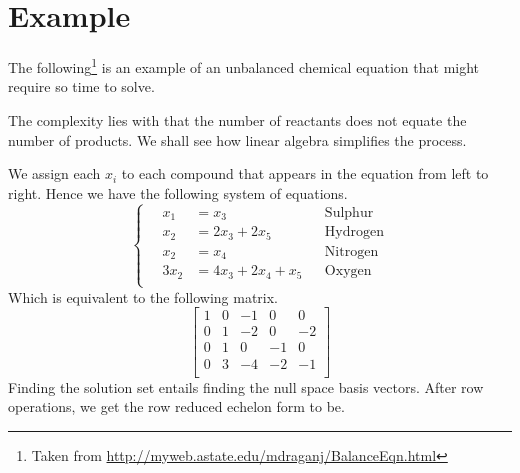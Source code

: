 \documentclass{article}
\begin{document}
\section{Example}
The following\footnote{Taken from \url{http://myweb.astate.edu/mdraganj/BalanceEqn.html}} is an example of an unbalanced chemical equation that might require so time to solve.
\begin{center}
\end{center}
The complexity lies with that the number of reactants does not equate the number of products. We shall see how linear algebra simplifies the process.

We assign each $x_i$ to each compound that appears in the equation from left to right. Hence we have the following system of equations.
\begin{equation*}
\left\{
\quad
	\begin{aligned}
	x_1  &= x_3 &&\text{Sulphur}\\
	x_2  &= 2x_3 + 2x_5 &&\text{Hydrogen}\\
	x_2  &= x_4 &&\text{Nitrogen}\\
	3x_2 &= 4x_3 + 2x_4 + x_5 &&\text{Oxygen} \\
	\end{aligned}
\right.
\end{equation*}
Which is equivalent to the following matrix.
\begin{equation*}
\begin{bmatrix} 
1 &  0 & -1 &  0 &  0 \\
0 &  1 & -2 &  0 & -2 \\
0 &  1 &  0 & -1 &  0 \\
0 &  3 & -4 & -2 & -1 \\
 
\end{bmatrix}
\end{equation*}
Finding the solution set entails finding the null space basis vectors. After row operations, we get the row reduced echelon form to be.
\end{document}
